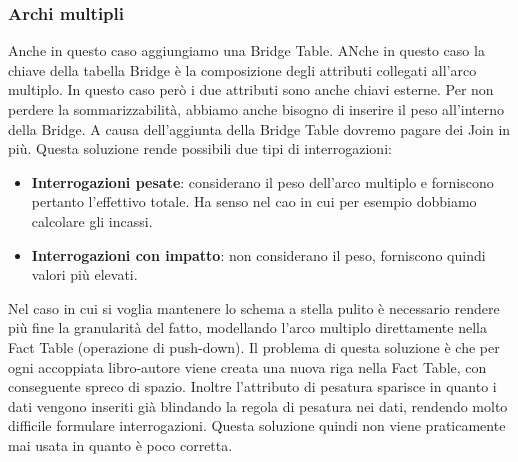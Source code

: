 \subsubsection{Archi multipli}
Anche in questo caso aggiungiamo una Bridge Table. ANche in questo caso la chiave della tabella Bridge è la composizione degli attributi collegati all'arco multiplo.\newline
In questo caso però i due attributi sono anche chiavi esterne. Per non perdere la sommarizzabilità, abbiamo anche bisogno di inserire il peso all'interno della Bridge.
A causa dell'aggiunta della Bridge Table dovremo pagare dei Join in più. Questa soluzione rende possibili due tipi di interrogazioni:
\begin{itemize}
	\item \textbf{Interrogazioni pesate}: considerano il peso dell'arco multiplo e forniscono pertanto l'effettivo totale. Ha senso nel cao in cui per esempio dobbiamo calcolare gli incassi.
	\item \textbf{Interrogazioni con impatto}: non considerano il peso, forniscono quindi valori più elevati.
\end{itemize}
Nel caso in cui si voglia mantenere lo schema a stella pulito è necessario rendere più fine la granularità del fatto, modellando l'arco multiplo direttamente nella Fact Table (operazione di push-down).
Il problema di questa soluzione è che per ogni accoppiata libro-autore viene creata una nuova riga nella Fact Table, con conseguente spreco di spazio. Inoltre l'attributo di pesatura sparisce in quanto i dati vengono inseriti già blindando la regola di pesatura nei dati, rendendo molto difficile formulare interrogazioni.\newline
Questa soluzione quindi non viene praticamente mai usata in quanto è poco corretta.
